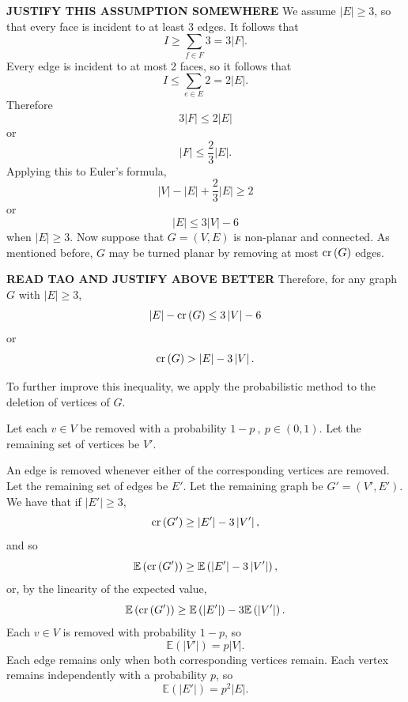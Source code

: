 \documentclass[12pt]{amsart}
\begin{document}
\textbf{JUSTIFY THIS ASSUMPTION SOMEWHERE}
We assume \(\left\lvert E \right\rvert  \geq 3\), so that every face is incident to at least 3 edges.
It follows that
\[
    I \geq \sum _{f \in F} 3 = 3 \left\lvert F \right\rvert 
.\]
Every edge is incident to at most 2 faces, so it follows that
\[
    I \leq \sum _{e \in E} 2 = 2 \left\lvert E \right\rvert 
.\]
Therefore
\[
    3 \left\lvert F \right\rvert \leq 2 \left\lvert E \right\rvert 
\]
or
\[
    \left\lvert F \right\rvert \leq \frac{2}{3} \left\lvert E \right\rvert 
.\]
Applying this to Euler's formula,
\[
    \left\lvert V \right\rvert - \left\lvert E \right\rvert + \frac{2}{3} \left\lvert E \right\rvert \geq 2
\]
or
\[
    \left\lvert E \right\rvert \leq 3 \left\lvert V \right\rvert -6
\]
when \(\left\lvert E \right\rvert \geq 3\).
Now suppose that \(G = (V,E)\) is non-planar and connected. As mentioned before, \(G\) may be turned planar by removing
at most \(\operatorname{cr}\left( G \right) \) edges.

\textbf{READ TAO AND JUSTIFY ABOVE BETTER}
Therefore, for any graph \(G\) with \(\left\lvert E \right\rvert  \geq 3\),
\[
    \left\lvert E \right\rvert - \operatorname{cr}\left( G \right) \leq 3 \left\lvert V \right\rvert - 6
\]
or
\[
    \operatorname{cr}\left( G \right) > \left\lvert E \right\rvert - 3 \left\lvert V \right\rvert 
.\]

To further improve this inequality, we apply the probabilistic method
to the deletion of vertices of \(G\).

Let each \(v \in V\) be
removed with a probability \(1-p~,~  p \in (0,1)\). Let the remaining set of vertices be \(V'\). 

An edge is
removed whenever either of the corresponding vertices are removed. Let the remaining set of edges be \(E'\). Let the remaining graph be
\(G' = (V',E')\). We have that if \(\left\lvert E' \right\rvert \geq 3\),
\[
    \operatorname{cr}\left( G' \right) \geq \left\lvert E' \right\rvert - 3 \left\lvert V' \right\rvert 
,\]
and so
\[
    \mathbb{E} \left( \operatorname{cr}\left( G' \right)  \right) \geq \mathbb{E} \left( \left\lvert E' \right\rvert - 3 \left\lvert V' \right\rvert  \right) 
,\]
or, by the linearity of the expected value,
\[
    \mathbb{E} \left( \operatorname{cr}\left( G' \right)  \right) \geq \mathbb{E} \left( \left\lvert E' \right\rvert  \right) - 3 \mathbb{E} \left( \left\lvert V' \right\rvert  \right)    
.\]
Each \(v \in V\) is removed with probability \(1-p\), so
\[
    \mathbb{E} \left( \left\lvert V' \right\rvert  \right) = p \left\lvert V \right\rvert 
.\]
Each edge remains only when both corresponding vertices remain. Each vertex remains
independently with a probability \(p\), so 
\[
    \mathbb{E} \left( \left\lvert E' \right\rvert  \right) = p^{2}\left\lvert E \right\rvert 
.\]
\end{document}
